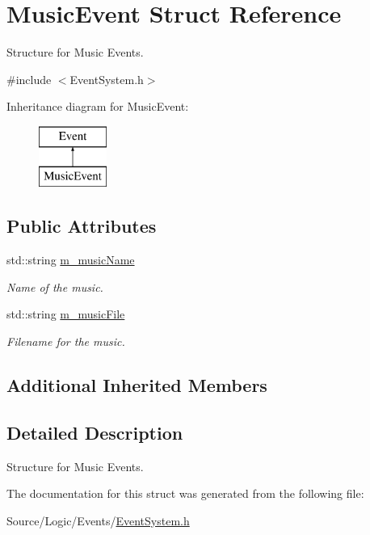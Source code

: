 \hypertarget{struct_music_event}{}\section{Music\+Event Struct Reference}
\label{struct_music_event}


Structure for Music Events.  




{\ttfamily \#include $<$Event\+System.\+h$>$}

Inheritance diagram for Music\+Event\+:\begin{figure}[H]
\begin{center}
\leavevmode
\includegraphics[height=2.000000cm]{struct_music_event}
\end{center}
\end{figure}
\subsection*{Public Attributes}
\begin{DoxyCompactItemize}
\item 
\mbox{\label{struct_music_event_a3e703e2628fef9339308ffeee1afdb77}} 
std\+::string \mbox{\hyperlink{struct_music_event_a3e703e2628fef9339308ffeee1afdb77}{m\+\_\+music\+Name}}
\begin{DoxyCompactList}\small\item\em Name of the music. \end{DoxyCompactList}\item 
\mbox{\label{struct_music_event_a64b7bbf0eeb292bf122ec18ba8e72916}} 
std\+::string \mbox{\hyperlink{struct_music_event_a64b7bbf0eeb292bf122ec18ba8e72916}{m\+\_\+music\+File}}
\begin{DoxyCompactList}\small\item\em Filename for the music. \end{DoxyCompactList}\end{DoxyCompactItemize}
\subsection*{Additional Inherited Members}


\subsection{Detailed Description}
Structure for Music Events. 

The documentation for this struct was generated from the following file\+:\begin{DoxyCompactItemize}
\item 
Source/\+Logic/\+Events/\mbox{\hyperlink{_event_system_8h}{Event\+System.\+h}}\end{DoxyCompactItemize}
